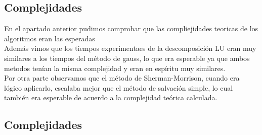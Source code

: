 \subsection{Complejidades}
En el apartado anterior pudimos comprobar que las compliejidades teoricas de los algoritmos eran las esperadas 
\\
Además vimos que los tiempos experimentaes de la descomposición LU eran muy similares a los tiempos del método de gauss, lo que era esperable ya que ambos metodos tenían la misma complejidad y eran en espíritu muy similares.
\\
Por otra parte observamos que el método de Sherman-Morrison, cuando era lógico aplicarlo, escalaba mejor que el método de salvación simple, lo cual también era esperable de acuerdo a la complejidad teórica calculada.
\subsection{Complejidades}
\Completar
